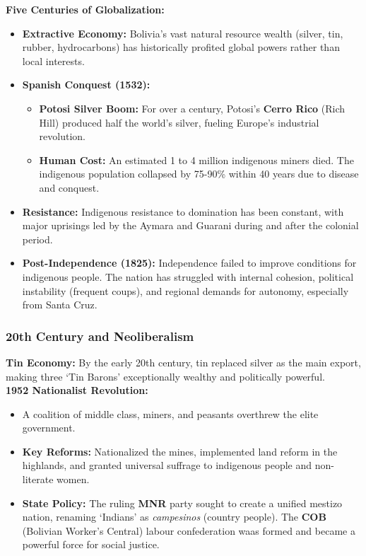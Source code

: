 \documentclass{article}
\begin{document}
    \noindent \textbf{Five Centuries of Globalization:}
    \begin{itemize}
        \item \textbf{Extractive Economy:} Bolivia's vast natural resource
        wealth (silver, tin, rubber, hydrocarbons) has historically profited
        global powers rather than local interests.
        \item \textbf{Spanish Conquest (1532):}
        \begin{itemize}
            \item \textbf{Potosi Silver Boom:} For over a century, Potosi's \textbf{Cerro Rico} (Rich Hill) produced half the world's silver, fueling Europe's industrial revolution.
            \item \textbf{Human Cost:} An estimated 1 to 4 million
            indigenous miners died. The indigenous population collapsed by
            75-90\% within 40 years due to disease and conquest.
        \end{itemize}
        \item \textbf{Resistance:} Indigenous resistance to domination has
        been constant, with major uprisings led by the Aymara and Guarani
        during and after the colonial period.
        \item \textbf{Post-Independence (1825):} Independence failed to
        improve conditions for indigenous people. The nation has struggled
        with internal cohesion, political instability (frequent coups), and
        regional demands for autonomy, especially from Santa Cruz.
    \end{itemize}

    \subsubsection{20th Century and Neoliberalism}

    \noindent \textbf{Tin Economy:} By the early 20th century, tin replaced
silver as the main export, making three `Tin Barons' exceptionally wealthy
and politically powerful.\\

    \noindent \textbf{1952 Nationalist Revolution:}
    \begin{itemize}
        \item A coalition of middle class, miners, and peasants overthrew
        the elite government.
        \item \textbf{Key Reforms:} Nationalized the mines, implemented land
        reform in the highlands, and granted universal suffrage to
        indigenous people and non-literate women.
        \item \textbf{State Policy:} The ruling \textbf{MNR} party sought to
        create a unified mestizo nation, renaming `Indians' as
        \textit{campesinos} (country people). The
        \textbf{COB} (Bolivian Worker's Central) labour confederation waas
        formed and became a powerful force for social justice.
    \end{itemize}
\end{document}
